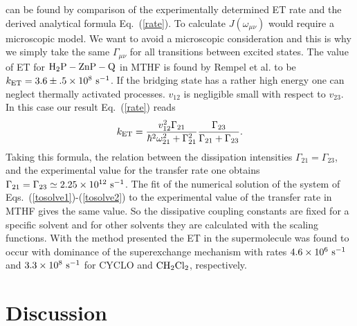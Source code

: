\documentclass[12pt,twoside,a4paper]{report}
\begin{document}
can be found by comparison of the
experimentally determined ET rate and the derived analytical
formula Eq.~(\ref{rate}). To calculate  
$J(\omega_{\mu{} \nu })$ would require a microscopic model.
We want to avoid a microscopic consideration and
 this is why we simply
take the same $\Gamma_{\mu{}\nu}$ 
for  all transitions between excited states. 
The value of ET for ${\rm H_2P-ZnP-Q}$ in MTHF
is found by Rempel et al. \cite{r4} to be 
$k_{\rm ET}=3.6\pm{}.5 \times{}10^8 ~{\rm s}^{-1}$.  
If the bridging state has a rather high energy 
one can neglect thermally activated processes. 
$v_{12}$ is negligible small with respect to $v_{23}$.  
In this case our result Eq.~(\ref{rate}) reads
\begin{eqnarray}
k_{\rm ET}
          =     \frac{v_{12}^2\Gamma_{21}}
                     {\hbar^2\omega_{21}^2+\Gamma_{21}^2}
                \frac{\Gamma_{23}}
                     {\Gamma_{21}+\Gamma_{23}}.
\end{eqnarray}
Taking this formula, the relation between the dissipation intensities 
$\Gamma_{21}=\Gamma_{23}$,
and the
experimental value for the transfer rate one obtains 
$\Gamma_{21}=\Gamma_{23}\simeq2.25\times{}10^{12} ~{\rm s}^{-1}$.
The fit of the numerical solution of the system of Eqs.~(\ref{tosolve1})-(\ref{tosolve2})
to the experimental value of the transfer rate in MTHF
gives the same value.  
So the dissipative coupling constants are fixed
for a specific solvent and for other solvents they are calculated with 
the scaling functions.
With the method presented 
the ET 
in the supermolecule was found to occur  
with dominance of the superexchange mechanism 
with rates $4.6\times{}10^{6} ~{\rm s}^{-1}$
and $3.3 \times{}10^8  ~{\rm s}^{-1}$ for CYCLO and ${\rm CH_2Cl_2}$, respectively. 


\section{Discussion} \label{chem-discussion}
\end{document}
